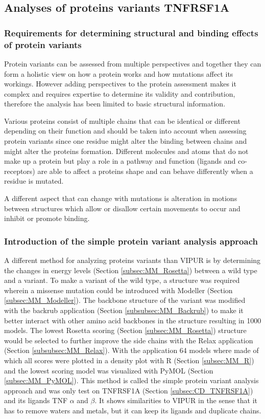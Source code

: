 \newpage
\subsection{Analyses of proteins variants TNFRSF1A}
	\subsubsection{Requirements for determining structural and binding effects of protein variants}
	Protein variants can be assessed from multiple perspectives and together they can form a holistic view on how a protein works and how mutations affect its workings. However adding perspectives to the protein assessment makes it complex and requires expertise to determine its validity and contribution, therefore the analysis has been limited to basic structural information.
	
	Various proteins consist of multiple chains that can be identical or different depending on their function \cite{liu_lipin_2010} and should be taken into account when assessing protein variants since one residue might alter the binding between chains and might alter the proteins formation. 
	Different molecules and atoms that do not make up a protein but play a role in a pathway and function (ligands and co-receptors) are able to affect a proteins shape \cite{koshland_application_1958} and can behave differently when a residue is mutated. 
	
	A different aspect that can change with mutations is alteration in motions between structures which allow or disallow certain movements to occur and inhibit or promote binding.
	
	\subsubsection{Introduction of the simple protein variant analysis approach}

	A different method for analyzing proteins variants than VIPUR is by determining the changes in energy levels (Section \ref{subsec:MM_Rosetta}) between a wild type and a variant.
	To make a variant of the wild type, a structure was required wherein a missense mutation could be introduced with Modeller (Section \ref{subsec:MM_Modeller}).
	The backbone structure of the variant was modified with the backrub application (Section \ref{subsubsec:MM_Backrub}) to make it better interact with other amino acid backbones in the structure resulting in 1000 models. 
	The lowest Rosetta scoring (Section \ref{subsec:MM_Rosetta}) structure would be selected to further improve the side chains with the Relax application (Section \ref{subsubsec:MM_Relax}). 
	With the application 64 models where made of which all scores were plotted in a density plot with R (Section \ref{subsec:MM_R}) and the lowest scoring model was visualized with PyMOL (Section \ref{subsec:MM_PyMOL}).
	This method is called the simple protein variant analysis approach and was only test on TNFRSF1A (Section \ref{subsec:CD_TNFRSF1A}) and its ligands TNF $\alpha$ and $\beta$. 
	It shows similarities to VIPUR in the sense that it has to remove waters and metals, but it can keep its ligands and duplicate chains.


